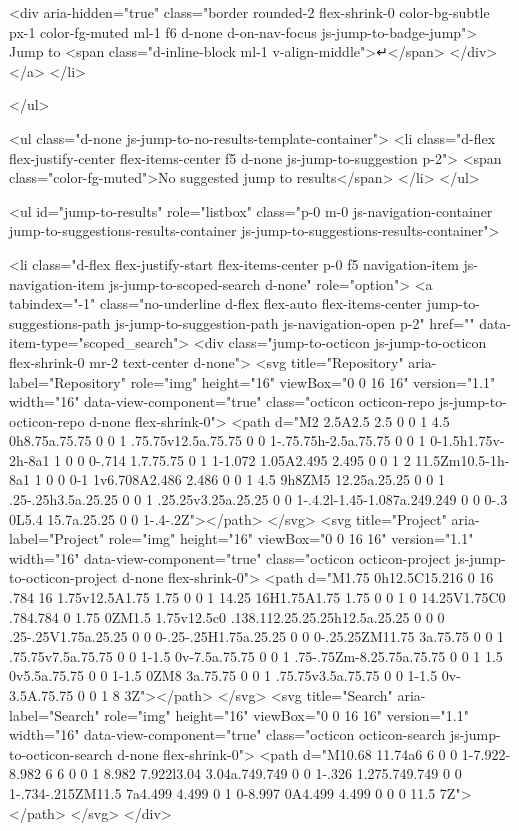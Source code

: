     <div aria-hidden="true" class="border rounded-2 flex-shrink-0 color-bg-subtle px-1 color-fg-muted ml-1 f6 d-none d-on-nav-focus js-jump-to-badge-jump">
      Jump to
      <span class="d-inline-block ml-1 v-align-middle">↵</span>
    </div>
  </a>
</li>

</ul>

<ul class="d-none js-jump-to-no-results-template-container">
  <li class="d-flex flex-justify-center flex-items-center f5 d-none js-jump-to-suggestion p-2">
    <span class="color-fg-muted">No suggested jump to results</span>
  </li>
</ul>

<ul id="jump-to-results" role="listbox" class="p-0 m-0 js-navigation-container jump-to-suggestions-results-container js-jump-to-suggestions-results-container">
  

<li class="d-flex flex-justify-start flex-items-center p-0 f5 navigation-item js-navigation-item js-jump-to-scoped-search d-none" role="option">
  <a tabindex="-1" class="no-underline d-flex flex-auto flex-items-center jump-to-suggestions-path js-jump-to-suggestion-path js-navigation-open p-2" href="" data-item-type="scoped_search">
    <div class="jump-to-octicon js-jump-to-octicon flex-shrink-0 mr-2 text-center d-none">
      <svg title="Repository" aria-label="Repository" role="img" height="16" viewBox="0 0 16 16" version="1.1" width="16" data-view-component="true" class="octicon octicon-repo js-jump-to-octicon-repo d-none flex-shrink-0">
    <path d="M2 2.5A2.5 2.5 0 0 1 4.5 0h8.75a.75.75 0 0 1 .75.75v12.5a.75.75 0 0 1-.75.75h-2.5a.75.75 0 0 1 0-1.5h1.75v-2h-8a1 1 0 0 0-.714 1.7.75.75 0 1 1-1.072 1.05A2.495 2.495 0 0 1 2 11.5Zm10.5-1h-8a1 1 0 0 0-1 1v6.708A2.486 2.486 0 0 1 4.5 9h8ZM5 12.25a.25.25 0 0 1 .25-.25h3.5a.25.25 0 0 1 .25.25v3.25a.25.25 0 0 1-.4.2l-1.45-1.087a.249.249 0 0 0-.3 0L5.4 15.7a.25.25 0 0 1-.4-.2Z"></path>
</svg>
      <svg title="Project" aria-label="Project" role="img" height="16" viewBox="0 0 16 16" version="1.1" width="16" data-view-component="true" class="octicon octicon-project js-jump-to-octicon-project d-none flex-shrink-0">
    <path d="M1.75 0h12.5C15.216 0 16 .784 16 1.75v12.5A1.75 1.75 0 0 1 14.25 16H1.75A1.75 1.75 0 0 1 0 14.25V1.75C0 .784.784 0 1.75 0ZM1.5 1.75v12.5c0 .138.112.25.25.25h12.5a.25.25 0 0 0 .25-.25V1.75a.25.25 0 0 0-.25-.25H1.75a.25.25 0 0 0-.25.25ZM11.75 3a.75.75 0 0 1 .75.75v7.5a.75.75 0 0 1-1.5 0v-7.5a.75.75 0 0 1 .75-.75Zm-8.25.75a.75.75 0 0 1 1.5 0v5.5a.75.75 0 0 1-1.5 0ZM8 3a.75.75 0 0 1 .75.75v3.5a.75.75 0 0 1-1.5 0v-3.5A.75.75 0 0 1 8 3Z"></path>
</svg>
      <svg title="Search" aria-label="Search" role="img" height="16" viewBox="0 0 16 16" version="1.1" width="16" data-view-component="true" class="octicon octicon-search js-jump-to-octicon-search d-none flex-shrink-0">
    <path d="M10.68 11.74a6 6 0 0 1-7.922-8.982 6 6 0 0 1 8.982 7.922l3.04 3.04a.749.749 0 0 1-.326 1.275.749.749 0 0 1-.734-.215ZM11.5 7a4.499 4.499 0 1 0-8.997 0A4.499 4.499 0 0 0 11.5 7Z"></path>
</svg>
    </div>

